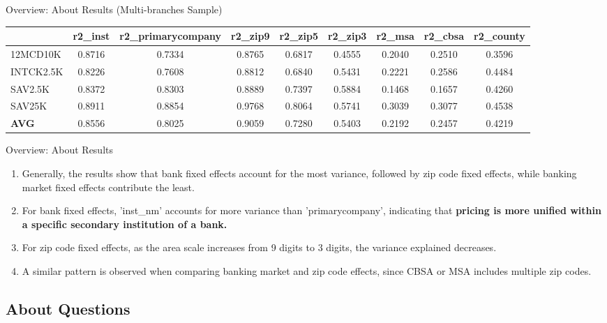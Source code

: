 \documentclass{beamer}
\begin{document}
\begin{frame}{Overview: About Results (Multi-branches Sample) }

    \centering
\fontsize{5pt}{6pt}\selectfont
        \begin{tabular}{lcccccccc}
        \toprule
        & \textbf{r2\_inst} & \textbf{r2\_primarycompany} & \textbf{r2\_zip9} & \textbf{r2\_zip5} & \textbf{r2\_zip3} & \textbf{r2\_msa} & \textbf{r2\_cbsa} & \textbf{r2\_county} \\
        \midrule
        12MCD10K   & 0.8716 & 0.7334 & 0.8765 & 0.6817 & 0.4555 & 0.2040 & 0.2510 & 0.3596 \\
        INTCK2.5K  & 0.8226 & 0.7608 & 0.8812 & 0.6840 & 0.5431 & 0.2221 & 0.2586 & 0.4484 \\
        SAV2.5K    & 0.8372 & 0.8303 & 0.8889 & 0.7397 & 0.5884 & 0.1468 & 0.1657 & 0.4260 \\
        SAV25K     & 0.8911 & 0.8854 & 0.9768 & 0.8064 & 0.5741 & 0.3039 & 0.3077 & 0.4538 \\
        \midrule
        \textbf{AVG} & 0.8556 & 0.8025 & 0.9059 & 0.7280 & 0.5403 & 0.2192 & 0.2457 & 0.4219 \\
        \bottomrule
    \end{tabular}
\end{frame}



\begin{frame}{Overview: About Results}
\begin{enumerate}
    \item Generally, the results show that bank fixed effects account for the most variance, followed by zip code fixed effects, while banking market fixed effects contribute the least.
    \item For bank fixed effects, 'inst\_nm' accounts for more variance than 'primarycompany', indicating that \textbf{pricing is more unified within a specific secondary institution of a bank.}
    \item For zip code fixed effects, as the area scale increases from 9 digits to 3 digits, the variance explained decreases.
    \item A similar pattern is observed when comparing banking market and zip code effects, since CBSA or MSA includes multiple zip codes.
\end{enumerate}
\end{frame}

\subsection{About Questions}
\end{document}
